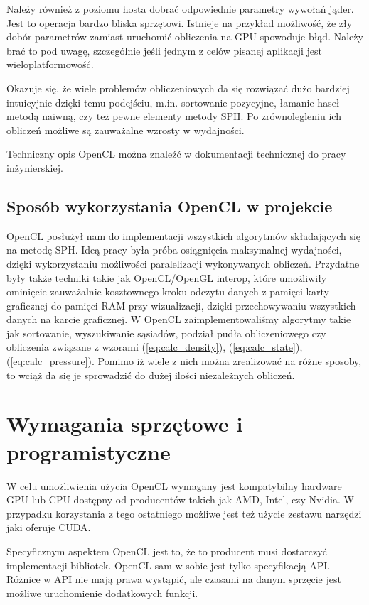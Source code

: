 \documentclass[polish, 12pt]{aghthesis}
\begin{document}
			Należy również z poziomu hosta dobrać odpowiednie parametry wywołań jąder. Jest to operacja bardzo bliska sprzętowi. Istnieje na przykład możliwość, że zły dobór parametrów zamiast uruchomić obliczenia na GPU spowoduje błąd. Należy brać to pod uwagę, szczególnie jeśli jednym z celów pisanej aplikacji jest wieloplatformowość.
			
			Okazuje się, że wiele problemów obliczeniowych da się rozwiązać dużo bardziej intuicyjnie dzięki temu podejściu, m.in. sortowanie pozycyjne, łamanie haseł metodą naiwną, czy też pewne elementy metody SPH. Po zrównolegleniu ich obliczeń możliwe są zauważalne wzrosty w wydajności. 
			
			Techniczny opis OpenCL można znaleźć w dokumentacji technicznej do pracy inżynierskiej.
		
		\subsection{Sposób wykorzystania OpenCL w projekcie}
			OpenCL posłużył nam do implementacji wszystkich algorytmów składających się na metodę SPH. Ideą pracy była próba osiągnięcia maksymalnej wydajności, dzięki wykorzystaniu możliwości paralelizacji wykonywanych obliczeń. Przydatne były także techniki takie jak OpenCL/OpenGL interop, które umożliwiły ominięcie zauważalnie kosztownego kroku odczytu danych z pamięci karty graficznej do pamięci RAM przy wizualizacji, dzięki przechowywaniu wszystkich danych na karcie graficznej. W OpenCL zaimplementowaliśmy algorytmy takie jak sortowanie, wyszukiwanie sąsiadów, podział pudła obliczeniowego czy obliczenia związane z wzorami (\ref{eq:calc_density}), (\ref{eq:calc_state}), (\ref{eq:calc_pressure}). Pomimo iż wiele z nich można zrealizować na różne sposoby, to wciąż da się je sprowadzić do dużej ilości niezależnych obliczeń.
			
	\section{Wymagania sprzętowe i programistyczne}
		W celu umożliwienia użycia OpenCL wymagany jest kompatybilny hardware GPU lub CPU dostępny od producentów takich jak AMD, Intel, czy Nvidia. W przypadku korzystania z tego ostatniego możliwe jest też użycie zestawu narzędzi jaki oferuje CUDA.
		
		Specyficznym aspektem OpenCL jest to, że to producent musi dostarczyć implementacji bibliotek. OpenCL sam w sobie jest tylko specyfikacją API. Różnice w API nie mają prawa wystąpić, ale czasami na danym sprzęcie jest możliwe uruchomienie dodatkowych funkcji.
		
\end{document}
